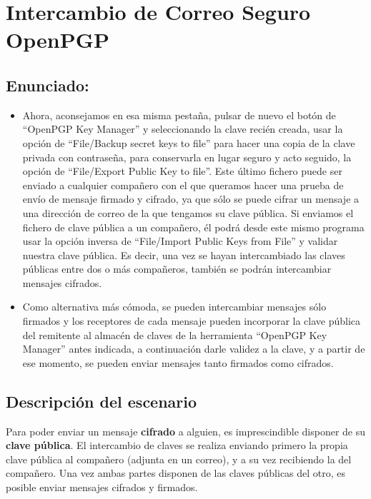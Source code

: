 \chapter{Intercambio de Correo Seguro OpenPGP}

\section{Enunciado:}
\begin{itemize}[label=\textbullet]
    \item Ahora, aconsejamos en esa misma pestaña, pulsar de nuevo el botón de ``OpenPGP Key
    Manager'' y seleccionando la clave recién creada, usar la opción de ``File/Backup secret keys
    to file'' para hacer una copia de la clave privada con contraseña, para conservarla en lugar
    seguro y acto seguido, la opción de ``File/Export Public Key to file''. Este último fichero
    puede ser enviado a cualquier compañero con el que queramos hacer una prueba de envío de
    mensaje firmado y cifrado, ya que sólo se puede cifrar un mensaje a una dirección de correo
    de la que tengamos su clave pública. Si enviamos el fichero de clave pública a un compañero,
    él podrá desde este mismo programa usar la opción inversa de ``File/Import Public Keys
    from File'' y validar nuestra clave pública. Es decir, una vez se hayan intercambiado las
    claves públicas entre dos o más compañeros, también se podrán intercambiar mensajes
    cifrados.
    \item Como alternativa más cómoda, se pueden intercambiar mensajes sólo firmados y los
    receptores de cada mensaje pueden incorporar la clave pública del remitente al almacén de
    claves de la herramienta ``OpenPGP Key Manager'' antes indicada, a continuación darle
    validez a la clave, y a partir de ese momento, se pueden enviar mensajes tanto firmados como
    cifrados.
\end{itemize}

\section{Descripción del escenario}

Para poder enviar un mensaje \textbf{cifrado} a alguien, es imprescindible disponer de su \textbf{clave pública}. El intercambio de claves se realiza enviando primero la propia clave pública al compañero (adjunta en un correo), y a su vez recibiendo la del compañero. Una vez ambas partes disponen de las claves públicas del otro, es posible enviar mensajes cifrados y firmados.

